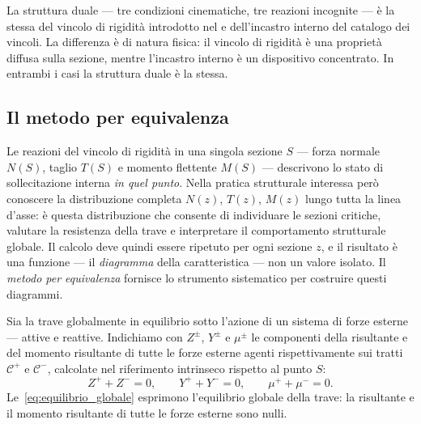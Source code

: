 \begin{oss}
	La struttura duale --- tre condizioni cinematiche,
	tre reazioni incognite --- è la stessa del
	vincolo di rigidità introdotto nel
	 e dell'incastro interno
	del catalogo dei vincoli. La differenza è di
	natura fisica: il vincolo di rigidità è una
	proprietà diffusa sulla sezione, mentre l'incastro
	interno è un dispositivo concentrato. In entrambi
	i casi la struttura duale è la stessa.
\end{oss}


\subsection{Il metodo per equivalenza}
\label{sec:caratteristiche_calcolo}

Le reazioni del vincolo di rigidità in una singola
sezione $S$ --- forza normale $N(S)$, taglio $T(S)$
e momento flettente $M(S)$ --- descrivono lo stato
di sollecitazione interna \emph{in quel punto}.
Nella pratica strutturale interessa però conoscere
la distribuzione completa $N(z)$, $T(z)$, $M(z)$
lungo tutta la linea d'asse: è questa distribuzione
che consente di individuare le sezioni critiche,
valutare la resistenza della trave e interpretare
il comportamento strutturale globale. Il calcolo
deve quindi essere ripetuto per ogni sezione $z$,
e il risultato è una funzione --- il
\emph{diagramma} della caratteristica --- non un
valore isolato. Il \emph{metodo per equivalenza}
fornisce lo strumento sistematico per costruire
questi diagrammi.


Sia la trave globalmente in equilibrio sotto l'azione
di un sistema di forze esterne --- attive e reattive.
Indichiamo con $Z^\pm$, $Y^\pm$ e $\mu^\pm$ le
componenti della risultante e del momento risultante
di tutte le forze esterne agenti rispettivamente sui
tratti $\mathcal{C}^+$ e $\mathcal{C}^-$, calcolate
nel riferimento intrinseco rispetto al punto $S$:
\begin{equation}\label{eq:equilibrio_globale}
	Z^+ + Z^- = 0, \qquad
	Y^+ + Y^- = 0, \qquad
	\mu^+ + \mu^- = 0.
\end{equation}
Le~\eqref{eq:equilibrio_globale} esprimono
l'equilibrio globale della trave: la risultante e
il momento risultante di tutte le forze esterne
sono nulli.

